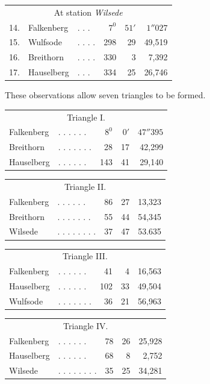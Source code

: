 \begin{center}
\begin{tabular}{r l l r r r}
\multicolumn{6}{c}{At station \textit{Wilsede}}\\[5pt]
14.&Falkenberg&. . .&\(7^0\)&\(51'\)&\(1''027\)\\
15.&Wulfsode&. . . .&298&29&49,519\\
16.&Breithorn&. . . .&330&3&7,392\\
17.&Hauselberg&. . .&334&25&26,746
\end{tabular}
\end{center}

These observations allow seven triangles to be formed.
\begin{center}
\begin{tabular}{l l r r r}
\multicolumn{5}{c}{Triangle I.}\\[5pt]
Falkenberg&. . . . . .&\(8^0\)&\(0'\)&\(47''395\)\\
Breithorn&. . . . . . .&28&17&42,299\\
Hauselberg&. . . . . .&143&41&29,140
\end{tabular}
\end{center}
\begin{center}
\begin{tabular}{l l r r r}
\multicolumn{5}{c}{Triangle II.}\\[5pt]
Falkenberg&. . . . . .&86&27&13,323\\
Breithorn&. . . . . . .&55&44&54,345\\
Wilsede&. . . . . . . .&37&47&53.635
\end{tabular}
\end{center}
\begin{center}
\begin{tabular}{l l r r r}
\multicolumn{5}{c}{Triangle III.}\\[5pt]
Falkenberg&. . . . . .&41&4&16,563\\
Hauselberg&. . . . . .&102&33&49,504\\
Wulfsode&. . . . . . .&36&21&56,963
\end{tabular}
\end{center}
\begin{center}
\begin{tabular}{l l r r r}
\multicolumn{5}{c}{Triangle IV.}\\[5pt]
Falkenberg&. . . . . .&78&26&25,928\\
Hauselberg&. . . . . .&68&8&2,752\\
Wilsede&. . . . . . . .&35&25&34,281
\end{tabular}
\end{center}
